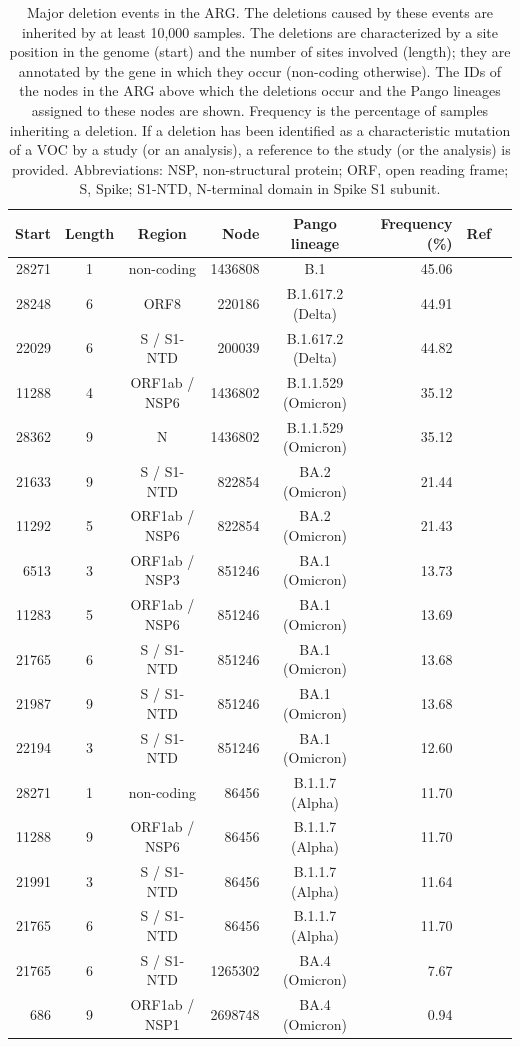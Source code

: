 \documentclass[12pt]{article}
\begin{document}
\begin{table}[h]
\centering
\caption{
Major deletion events in the ARG.
The deletions caused by these events
are inherited by at least 10,000 samples.
The deletions are characterized by
a site position in the genome (start) and
the number of sites involved (length);
they are annotated by the gene in which they occur
(non-coding otherwise).
The IDs of the nodes in the ARG
above which the deletions occur and
the Pango lineages assigned to these nodes are shown.
Frequency is the percentage of samples inheriting a deletion.
If a deletion has been identified
as a characteristic mutation of a VOC
by a study (or an analysis),
a reference to the study (or the analysis) is provided.
Abbreviations: NSP, non-structural protein;
ORF, open reading frame;
S, Spike;
S1-NTD, N-terminal domain in Spike S1 subunit.
}
\label{tab:major_dels}
\begin{tabular}{rccrcrrc}
\toprule
Start & Length & Region & Node & Pango lineage & Frequency (\%) & Ref\\
\midrule
28271 & 1 & non-coding & 1436808 & B.1 & 45.06 &  \\
28248 & 6 & ORF8 & 220186 & B.1.617.2 (Delta) & 44.91 & \cite{Stern2021} \\
22029 & 6 & S / S1-NTD & 200039 & B.1.617.2 (Delta) & 44.82 & \cite{Stern2021} \\
11288 & 4 & ORF1ab / NSP6 & 1436802 & B.1.1.529 (Omicron) & 35.12 &  \\
28362 & 9 & N & 1436802 & B.1.1.529 (Omicron) & 35.12 & \cite{RambautOmicron2021} \\
21633 & 9 & S / S1-NTD & 822854 & BA.2 (Omicron) & 21.44 & \cite{RambautOmicron2021} \\
11292 & 5 & ORF1ab / NSP6 & 822854 & BA.2 (Omicron) & 21.43 &  \\
6513 & 3 & ORF1ab / NSP3 & 851246 & BA.1 (Omicron) & 13.73 & \cite{RambautOmicron2021} \\
11283 & 5 & ORF1ab / NSP6 & 851246 & BA.1 (Omicron) & 13.69 &  \\
21765 & 6 & S / S1-NTD & 851246 & BA.1 (Omicron) & 13.68 & \cite{RambautOmicron2021} \\
21987 & 9 & S / S1-NTD & 851246 & BA.1 (Omicron) & 13.68 & \cite{RambautOmicron2021} \\
22194 & 3 & S / S1-NTD & 851246 & BA.1 (Omicron) & 12.60 & \cite{RambautOmicron2021} \\
28271 & 1 & non-coding & 86456 & B.1.1.7 (Alpha) & 11.70 &  \\
11288 & 9 & ORF1ab / NSP6 & 86456 & B.1.1.7 (Alpha) & 11.70 & \cite{RambautAlpha2020} \\
21991 & 3 & S / S1-NTD & 86456 & B.1.1.7 (Alpha) & 11.64 & \cite{RambautAlpha2020} \\
21765 & 6 & S / S1-NTD & 86456 & B.1.1.7 (Alpha) & 11.70 & \cite{RambautAlpha2020} \\
21765 & 6 & S / S1-NTD & 1265302 & BA.4 (Omicron) & 7.67 & \cite{Tegally2022} \\
686 & 9 & ORF1ab / NSP1 & 2698748 & BA.4 (Omicron) & 0.94 &  \\
\bottomrule
\end{tabular}
\end{table}
\end{document}
